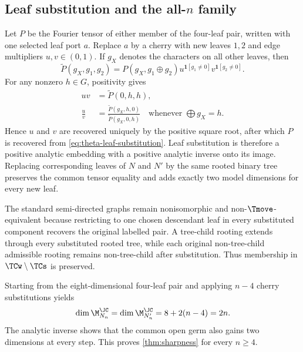 \subsection{Leaf substitution and the all-\texorpdfstring{$n$}{n} family}

Let $P$ be the Fourier tensor of either member of the four-leaf pair, written with one selected leaf port $a$.  Replace $a$ by a cherry with new leaves $1,2$ and edge multipliers $u,v\in(0,1)$.  If $g_X$ denotes the characters on all other leaves, then
\begin{equation}\label{eq:theta-leaf-substitution}
\widetilde P(g_X,g_1,g_2)
=P(g_X,g_1\oplus g_2)
 u^{\mathbf1[g_1\ne0]}v^{\mathbf1[g_2\ne0]}.
\end{equation}
For any nonzero $h\in G$, positivity gives
\begin{align}
uv&=\widetilde P(0,h,h),\label{eq:theta-cherry-product}\\
\frac uv&=
\frac{\widetilde P(g_X,h,0)}{\widetilde P(g_X,0,h)}
\quad\text{whenever }\bigoplus g_X=h.
\label{eq:theta-cherry-ratio}
\end{align}
Hence $u$ and $v$ are recovered uniquely by the positive square root, after which $P$ is recovered from \eqref{eq:theta-leaf-substitution}.  Leaf substitution is therefore a positive analytic embedding with a positive analytic inverse onto its image.  Replacing corresponding leaves of $N$ and $N'$ by the same rooted binary tree preserves the common tensor equality and adds exactly two model dimensions for every new leaf.

The standard semi-directed graphs remain nonisomorphic and non-$\Tmove$-equivalent because restricting to one chosen descendant leaf in every substituted component recovers the original labelled pair.  A tree-child rooting extends through every substituted rooted tree, while each original non-tree-child admissible rooting remains non-tree-child after substitution.  Thus membership in $\TCw\setminus\TCs$ is preserved.

Starting from the eight-dimensional four-leaf pair and applying $n-4$ cherry substitutions yields
\[
\dim \M_{N_n}^{\JC}
=\dim \M_{N_n'}^{\JC}
=8+2(n-4)=2n.
\]
The analytic inverse shows that the common open germ also gains two dimensions at every step.  This proves \cref{thm:sharpness} for every $n\ge4$.
